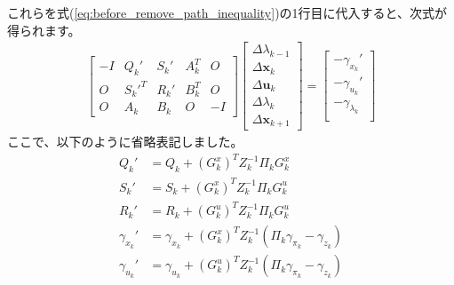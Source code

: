 \documentclass[a4paper]{jarticle}
\begin{document}
これらを式(\ref{eq:before_remove_path_inequality})の1行目に代入すると、次式が得られます。
\begin{align}
\begin{bmatrix}
 -I &  Q_{k}' & S_{k}' & A_{k}^T & O \\
 O &  S_{k}'^T & R_{k}' & B_{k}^T & O \\
O  & A_{k} & B_{k} &  O & -I
\end{bmatrix}
\begin{bmatrix}
\Delta \lambda_{k-1}\\
\Delta \mathbf{x}_{k}\\
\Delta \mathbf{u}_{k}\\
\Delta \lambda_{k}\\
\Delta \mathbf{x}_{k+1}
\end{bmatrix}
=
\begin{bmatrix}
-\gamma_{x_{k}}'\\
-\gamma_{u_{k}}'\\
-\gamma_{\lambda_{k}}\\
\end{bmatrix}
\label{eq:after_remove_path_inequality}
\end{align}
ここで、以下のように省略表記しました。
\begin{align*}
Q_{k}' &=Q_k +(G_k^x)^TZ_k^{-1}\Pi_kG_k^x
\\
S_{k}' &=S_k +(G_k^x)^TZ_k^{-1}\Pi_kG_k^u
\\
R_{k}' &=R_k +(G_k^u)^TZ_k^{-1}\Pi_kG_k^u
\\
\gamma_{x_k}' &=\gamma_{x_k}+(G_k^x)^TZ_k^{-1}(\Pi_k\gamma_{\pi_k}-\gamma_{z_k})
\\
\gamma_{u_k}' &=\gamma_{u_k}+(G_k^u)^TZ_k^{-1}(\Pi_k\gamma_{\pi_k}-\gamma_{z_k})
\end{align*}
\end{document}
